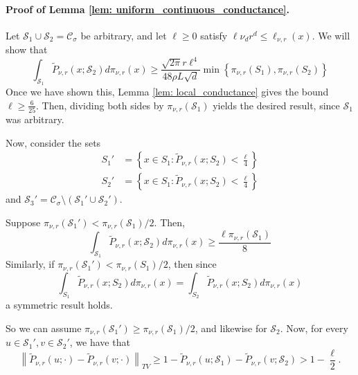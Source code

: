 \documentclass{article}
\newcommand{\set}[1]{\left\{#1\right\}}
\newcommand{\norm}[1]{\left\lVert#1\right\rVert}
\newcommand{\1}{\mathbf{1}}
\newcommand{\Sset}{\mathcal{S}}
\newcommand{\Cset}{\mathcal{C}}
\newcommand{\Csig}{\Cset_{\sigma}}
\theoremstyle{aldenthm}
\theoremstyle{aldenrmrk}
\begin{document}
\paragraph{Proof of Lemma \ref{lem: uniform_continuous_conductance}.}
Let $\Sset_1 \cup \Sset_2 = \Csig$ be arbitrary, and let $\ell \geq 0$ satisfy $\ell \nu_d r^d  \leq \ell_{\nu,r}(x)$. We will show that 
\begin{equation*}
\int_{\Sset_1} \widetilde{P}_{\nu,r}(x; \Sset_2) d \pi_{\nu,r}(x) \geq \frac{\sqrt{2 \pi} r \ell^4}{48 \rho L \sqrt{d}} \min\set{\pi_{\nu,r}(S_1), \pi_{\nu,r}(S_2)}
\end{equation*}
Once we have shown this, Lemma \ref{lem: local_conductance} gives the bound $\ell \geq \frac{6}{25}$. Then, dividing both sides by $\pi_{\nu,r}(\Sset_1)$ yields the desired result, since $\Sset_1$ was arbitrary.

Now, consider the sets
\begin{align*}
S_1' & = \set{x \in S_1: \widetilde{P}_{\nu,r}(x; S_2) < \frac{\ell}{4}} \\
S_2' & = \set{x \in S_1: \widetilde{P}_{\nu,r}(x; S_2) < \frac{\ell}{4}}
\end{align*}
and $\Sset_3' = \Csig \setminus (\Sset_1' \cup \Sset_2')$. 

Suppose $\pi_{\nu,r}(\Sset_1') < \pi_{\nu,r}(\Sset_1)/2$. Then,
\begin{equation*}
\int_{\Sset_1} \widetilde{P}_{\nu,r}(x; \Sset_2) d \pi_{\nu,r}(x) \geq \frac{\ell  \pi_{\nu,r}(\Sset_1)}{8}
\end{equation*}
Similarly, if $\pi_{\nu,r}(\Sset_1') < \pi_{\nu,r}(S_1)/2$, then since
\begin{equation*}
\int_{S_1} \widetilde{P}_{\nu,r}(x; S_2) d \pi_{\nu,r}(x) = \int_{S_2} \widetilde{P}_{\nu,r}(x; S_2) d \pi_{\nu,r}(x)
\end{equation*}
a symmetric result holds.

So we can assume $\pi_{\nu,r}(\Sset_1') \geq \pi_{\nu,r}(\Sset_1)/2$, and likewise for $\Sset_2$. Now, for every $u \in \Sset_1', v \in \Sset_2'$, we have that
\begin{equation*}
\norm{\widetilde{P}_{\nu,r}(u;\cdot) - \widetilde{P}_{\nu,r}(v;\cdot)}_{TV} \geq 1 - \widetilde{P}_{\nu,r}(u;\Sset_1) - \widetilde{P}_{\nu,r}(v;\Sset_2) > 1 - \frac{\ell}{2}.
\end{equation*}
\end{document}
